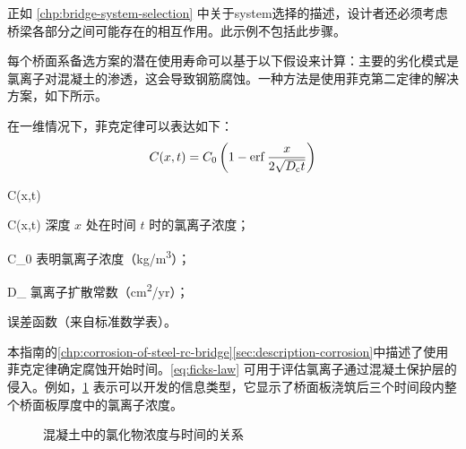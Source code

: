 正如 \cref{chp:bridge-system-selection} 中关于\gls*{system}选择的描述，设计者还必须考虑桥梁各部分之间可能存在的相互作用。此示例不包括此步骤。

每个桥面系备选方案的潜在使用寿命可以基于以下假设来计算：主要的劣化模式是氯离子对混凝土的渗透，这会导致钢筋腐蚀。一种方法是使用菲克第二定律的解决方案，如下所示。

在一维情况下，菲克定律可以表达如下：
\begin{equation}
  \label{eq:ficks-law}
  C(x,t)=C_0\left(1- \operatorname{erf} \frac{x}{2\sqrt{D_\text{c}t}} \right)
\end{equation}
\begin{EqDesc}{C(x,t)}
  \item[C(x,t)] 深度 $x$ 处在时间 $t$ 时的氯离子浓度；
  \item[C_0] 表明氯离子浓度（\unit{kg/m^3}）；
  \item[D_\text{c}] 氯离子扩散常数（\unit{cm^2/yr}）；
  \item[\erf] 误差函数（来自标准数学表）。
\end{EqDesc}

本指南的\cref{chp:corrosion-of-steel-rc-bridge}\cref{sec:description-corrosion}中描述了使用菲克定律确定腐蚀开始时间。\cref{eq:ficks-law} 可用于评估氯离子通过混凝土保护层的侵入。例如，\cref{fig:chloride-concentration} 表示可以开发的信息类型，它显示了桥面板浇筑后三个时间段内整个桥面板厚度中的氯离子浓度。

\begin{figure}
  \caption{混凝土中的氯化物浓度与时间的关系}\label{fig:chloride-concentration}
\end{figure}

